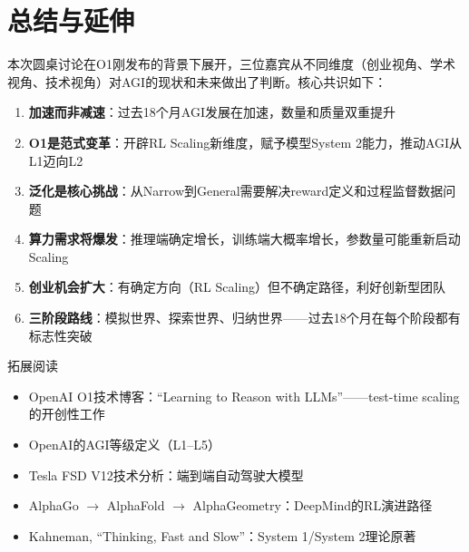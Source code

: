 \section{总结与延伸}

本次圆桌讨论在O1刚发布的背景下展开，三位嘉宾从不同维度（创业视角、学术视角、技术视角）对AGI的现状和未来做出了判断。核心共识如下：

\begin{enumerate}
\item \textbf{加速而非减速}：过去18个月AGI发展在加速，数量和质量双重提升
\item \textbf{O1是范式变革}：开辟RL Scaling新维度，赋予模型System 2能力，推动AGI从L1迈向L2
\item \textbf{泛化是核心挑战}：从Narrow到General需要解决reward定义和过程监督数据问题
\item \textbf{算力需求将爆发}：推理端确定增长，训练端大概率增长，参数量可能重新启动Scaling
\item \textbf{创业机会扩大}：有确定方向（RL Scaling）但不确定路径，利好创新型团队
\item \textbf{三阶段路线}：模拟世界、探索世界、归纳世界——过去18个月在每个阶段都有标志性突破
\end{enumerate}

\begin{knowledgebox}{拓展阅读}
\begin{itemize}
\item OpenAI O1技术博客：``Learning to Reason with LLMs''——test-time scaling的开创性工作
\item OpenAI的AGI等级定义（L1--L5）
\item Tesla FSD V12技术分析：端到端自动驾驶大模型
\item AlphaGo $\rightarrow$ AlphaFold $\rightarrow$ AlphaGeometry：DeepMind的RL演进路径
\item Kahneman, ``Thinking, Fast and Slow''：System 1/System 2理论原著
\end{itemize}
\end{knowledgebox}



